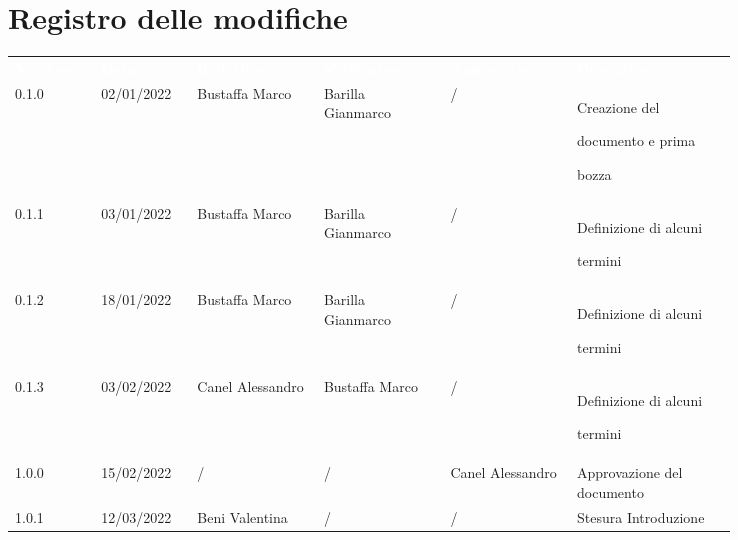 \section*{Registro delle modifiche}

{\renewcommand{\arraystretch}{1.5}
\scriptsize
\begin{tabular}{p{0.10\linewidth}p{0.10\linewidth}p{0.15\linewidth}p{0.15\linewidth}p{0.15\linewidth}p{0.19\linewidth}}
	\rowcolor[RGB]{33, 73, 50}
	\textcolor{white}{\textbf{Versione}} & \textcolor{white}{\textbf{Data}} &
	\textcolor{white}{\textbf{Redattore}} & \textcolor{white}{\textbf{Verificatore}} &
	\textcolor{white}{\textbf{Approvatore}} & \textcolor{white}{\textbf{Descrizione}}\\
	\rowcolor[RGB]{216, 235, 171}
	0.1.0 & 02/01/2022 & Bustaffa Marco & Barilla Gianmarco &/& Creazione del \par documento  e prima \par bozza\\
	\rowcolor[RGB]{233, 245, 206}
	0.1.1 & 03/01/2022 & Bustaffa Marco & Barilla Gianmarco &/& Definizione di alcuni \par termini\\
	\rowcolor[RGB]{216, 235, 171}
	0.1.2 & 18/01/2022 & Bustaffa Marco & Barilla Gianmarco &/& Definizione di alcuni \par termini\\
	\rowcolor[RGB]{233, 245, 206}
	0.1.3 & 03/02/2022 & Canel Alessandro & Bustaffa Marco &/& Definizione di alcuni \par termini\\
	\rowcolor[RGB]{216, 235, 171}
	1.0.0 & 15/02/2022 & / & / & Canel Alessandro& Approvazione del documento\\
	\rowcolor[RGB]{233, 245, 206}
	1.0.1 & 12/03/2022 & Beni Valentina & / & / & Stesura Introduzione\\

\end{tabular}
}
